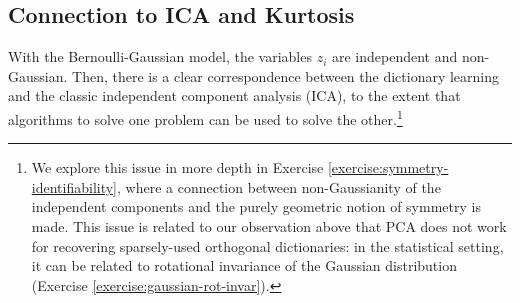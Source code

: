 \documentclass[../../book-main.tex]{subfiles}
\begin{document}
%
%



\subsection{Connection to ICA and Kurtosis}
With the Bernoulli-Gaussian model, the variables $z_i$ are independent and non-Gaussian. Then, there is a clear correspondence between the dictionary learning and the classic independent component analysis (ICA), to the extent that algorithms to solve one problem can be used to solve the other.\footnote{We explore this issue in more depth in Exercise \ref{exercise:symmetry-identifiability}, where a connection between non-Gaussianity of the independent components and the purely geometric notion of symmetry is made. This issue is related to our observation above that PCA does not work for recovering sparsely-used orthogonal dictionaries: in the statistical setting, it can be related to rotational invariance of the Gaussian distribution (Exercise \ref{exercise:gaussian-rot-invar}).} 
\end{document}
